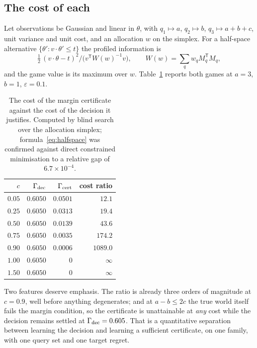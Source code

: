 \subsection{The cost of each}

Let observations be Gaussian and linear in $\theta$, with $q_{1}\mapsto a$,
$q_{2}\mapsto b$, $q_{3}\mapsto a+b+c$, unit variance and unit cost, and an allocation $w$
on the simplex. For a half-space alternative $\{\theta':v\cdot\theta'\le t\}$ the profiled
information is
\begin{equation}
\tfrac12\,(v\cdot\theta-t)^{2}\big/\bigl(v^{\mathsf T}W(w)^{-1}v\bigr),\qquad
W(w)=\textstyle\sum_{q}w_{q}M_{q}^{\mathsf T}M_{q},
\label{eq:halfspace}
\end{equation}
and the game value is its maximum over $w$. Table~\ref{tab:oraclegap} reports both games
at $a=3$, $b=1$, $\varepsilon=0.1$.

\begin{table}[t]
\caption{The cost of the margin certificate against the cost of the decision it justifies.
Computed by blind search over the allocation simplex; formula~\eqref{eq:halfspace} was
confirmed against direct constrained minimisation to a relative gap of $6.7\times10^{-4}$.
\NUM{}}
\label{tab:oraclegap}
\centering
\footnotesize
\begin{tabular}{@{}rrrr@{}}
\toprule
$c$ & $\Gamma_{\rm dec}$ & $\Gamma_{\rm cert}$ & cost ratio \\
\midrule
$0.05$ & $0.6050$ & $0.0501$ & $12.1$ \\
$0.25$ & $0.6050$ & $0.0313$ & $19.4$ \\
$0.50$ & $0.6050$ & $0.0139$ & $43.6$ \\
$0.75$ & $0.6050$ & $0.0035$ & $174.2$ \\
$0.90$ & $0.6050$ & $0.0006$ & $1089.0$ \\
$1.00$ & $0.6050$ & $0$ & $\infty$ \\
$1.50$ & $0.6050$ & $0$ & $\infty$ \\
\bottomrule
\end{tabular}
\end{table}

Two features deserve emphasis. The ratio is already three orders of magnitude at $c=0.9$,
well before anything degenerates; and at $a-b\le2c$ the true world itself fails the margin
condition, so the certificate is unattainable at \emph{any} cost while the decision remains
settled at $\Gamma_{\rm dec}=0.605$. That is a quantitative separation between learning the
decision and learning a sufficient certificate, on one family, with one query set and one
target regret.

